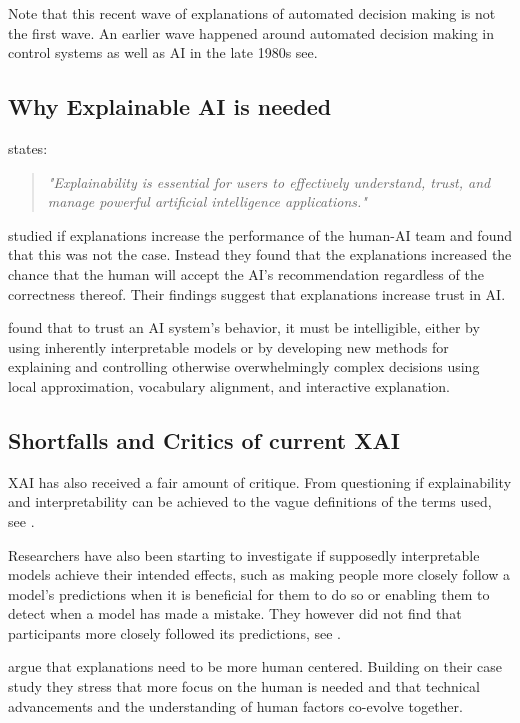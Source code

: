 \documentclass[manuscript,screen,review]{acmart}
\begin{document}
Note that this recent wave of explanations of automated decision making is not the first wave.
An earlier wave happened around automated decision making in control systems as well as AI in the late 1980s see\cite{Chandrasekaran1989}.

\subsection{Why Explainable AI is needed}\label{subsec:why-explainable-ai-is-needed}

\cite{Gunning2019} states:
\begin{quote}
    \textit{"Explainability is essential for users to effectively understand, trust, and manage powerful artificial intelligence applications."}
\end{quote}

\cite{Bansal2020} studied if explanations increase the performance of the human-AI team and found that this was not the case.
Instead they found that the explanations increased the chance that the human will accept the AI's recommendation regardless of the correctness thereof.
Their findings suggest that explanations increase trust in AI.

 \cite{Weld2019} found that to trust an AI system's behavior, it must be intelligible, either by using inherently interpretable models or by developing new methods for explaining and controlling otherwise overwhelmingly complex decisions using local approximation, vocabulary alignment, and interactive explanation.


\subsection{Shortfalls and Critics of current XAI}\label{subsec:shortfalls-and-critics-of-current-xai}

XAI has also received a fair amount of critique.
From questioning if explainability and interpretability can be achieved to the vague definitions of the terms used, see \cite{Lipton2018}.

Researchers have also been starting to investigate if supposedly interpretable models achieve their intended effects, such as making people more closely follow a model's predictions when it is beneficial for them to do so or enabling them to detect when a model has made a mistake.
They however did not find that participants more closely followed its predictions, see \cite{Goldstein2021}.

\cite{Ehsan2020} argue that explanations need to be more human centered.
Building on their case study they stress that more focus on the human is needed and that technical advancements and the understanding of human factors co-evolve together.
\end{document}
